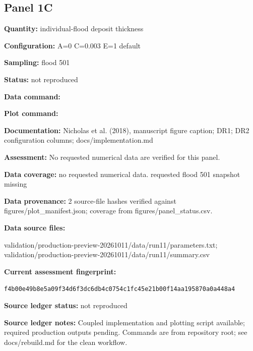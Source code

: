 \subsection*{Panel 1C}
\textbf{Quantity:} individual-flood deposit thickness

\textbf{Configuration:} A=0 C=0.003 E=1 default

\textbf{Sampling:} flood 501

\textbf{Status:} not reproduced

\textbf{Data command:}\par {\small \texttt{}}\par

\textbf{Plot command:}\par {\small \texttt{}}\par

\textbf{Documentation:} Nicholas et al. (2018), manuscript figure caption; DR1; DR2 configuration columns; docs/\allowbreak{}implementation.md

\textbf{Assessment:} No requested numerical data are verified for this panel.

\textbf{Data coverage:} no requested numerical data. requested flood 501 snapshot missing

\textbf{Data provenance:} 2 source-file hashes verified against figures/\allowbreak{}plot\_\allowbreak{}manifest.json; coverage from figures/\allowbreak{}panel\_\allowbreak{}status.csv.

\textbf{Data source files:}\par {\small\raggedright validation/\allowbreak{}production-preview-20261011/\allowbreak{}data/\allowbreak{}run11/\allowbreak{}parameters.txt; validation/\allowbreak{}production-preview-20261011/\allowbreak{}data/\allowbreak{}run11/\allowbreak{}summary.csv\par}

\textbf{Current assessment fingerprint:}\par {\small\texttt{f4b00e49b8e5a09f34d6f3dc6db4c0754c1fc45e21b00f14aa195870a0a448a4}}\par

\textbf{Source ledger status:} not reproduced

\textbf{Source ledger notes:} Coupled implementation and plotting script available; required production outputs pending. Commands are from repository root; see docs/\allowbreak{}rebuild.md for the clean workflow.

